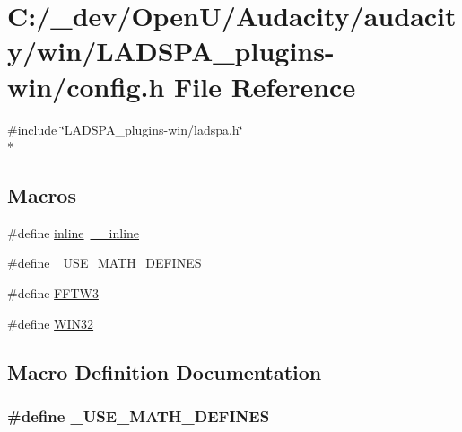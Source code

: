 \hypertarget{win_2_l_a_d_s_p_a__plugins-win_2config_8h}{}\section{C\+:/\+\_\+dev/\+Open\+U/\+Audacity/audacity/win/\+L\+A\+D\+S\+P\+A\+\_\+plugins-\/win/config.h File Reference}
\label{win_2_l_a_d_s_p_a__plugins-win_2config_8h}
{\ttfamily \#include \char`\"{}L\+A\+D\+S\+P\+A\+\_\+plugins-\/win/ladspa.\+h\char`\"{}}\\*
\subsection*{Macros}
\begin{DoxyCompactItemize}
\item 
\#define \hyperlink{win_2_l_a_d_s_p_a__plugins-win_2config_8h_a00d24c7231be28dbaf71f5408f30e44c}{inline}~\hyperlink{cdefs_8h_a96deb7ba5a74848afb710cc4ee6d2c08}{\+\_\+\+\_\+inline}
\item 
\#define \hyperlink{win_2_l_a_d_s_p_a__plugins-win_2config_8h_a525335710b53cb064ca56b936120431e}{\+\_\+\+U\+S\+E\+\_\+\+M\+A\+T\+H\+\_\+\+D\+E\+F\+I\+N\+ES}
\item 
\#define \hyperlink{win_2_l_a_d_s_p_a__plugins-win_2config_8h_aab58f0bc8b9dc6f7550b984a83101ba1}{F\+F\+T\+W3}
\item 
\#define \hyperlink{win_2_l_a_d_s_p_a__plugins-win_2config_8h_a6402e8b8594280624585b8fd643bfb65}{W\+I\+N32}
\end{DoxyCompactItemize}


\subsection{Macro Definition Documentation}
\subsubsection[{\texorpdfstring{\+\_\+\+U\+S\+E\+\_\+\+M\+A\+T\+H\+\_\+\+D\+E\+F\+I\+N\+ES}{_USE_MATH_DEFINES}}]{\setlength{\rightskip}{0pt plus 5cm}\#define \+\_\+\+U\+S\+E\+\_\+\+M\+A\+T\+H\+\_\+\+D\+E\+F\+I\+N\+ES}\hypertarget{win_2_l_a_d_s_p_a__plugins-win_2config_8h_a525335710b53cb064ca56b936120431e}{}\label{win_2_l_a_d_s_p_a__plugins-win_2config_8h_a525335710b53cb064ca56b936120431e}


